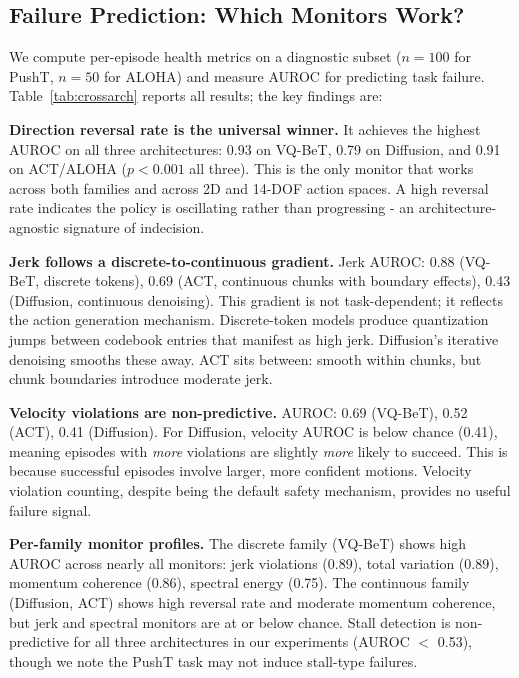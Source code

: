 \documentclass[conference]{IEEEtran}
\begin{document}
\subsection{Failure Prediction: Which Monitors Work?}
\label{sec:failure_prediction}

We compute per-episode health metrics on a diagnostic subset ($n{=}100$ for PushT, $n{=}50$ for ALOHA) and measure AUROC for predicting task failure.
Table~\ref{tab:crossarch} reports all results; the key findings are:

\textbf{Direction reversal rate is the universal winner.}
It achieves the highest AUROC on all three architectures: 0.93 on VQ-BeT, 0.79 on Diffusion, and 0.91 on ACT/ALOHA ($p < 0.001$ all three).
This is the only monitor that works across both families and across 2D and 14-DOF action spaces.
A high reversal rate indicates the policy is oscillating rather than progressing - an architecture-agnostic signature of indecision.

\textbf{Jerk follows a discrete-to-continuous gradient.}
Jerk AUROC: 0.88 (VQ-BeT, discrete tokens), 0.69 (ACT, continuous chunks with boundary effects), 0.43 (Diffusion, continuous denoising).
This gradient is not task-dependent; it reflects the action generation mechanism.
Discrete-token models produce quantization jumps between codebook entries that manifest as high jerk.
Diffusion's iterative denoising smooths these away.
ACT sits between: smooth within chunks, but chunk boundaries introduce moderate jerk.

\textbf{Velocity violations are non-predictive.}
AUROC: 0.69 (VQ-BeT), 0.52 (ACT), 0.41 (Diffusion).
For Diffusion, velocity AUROC is below chance (0.41), meaning episodes with \emph{more} violations are slightly \emph{more} likely to succeed.
This is because successful episodes involve larger, more confident motions.
Velocity violation counting, despite being the default safety mechanism, provides no useful failure signal.

\textbf{Per-family monitor profiles.}
The discrete family (VQ-BeT) shows high AUROC across nearly all monitors: jerk violations (0.89), total variation (0.89), momentum coherence (0.86), spectral energy (0.75).
The continuous family (Diffusion, ACT) shows high reversal rate and moderate momentum coherence, but jerk and spectral monitors are at or below chance.
Stall detection is non-predictive for all three architectures in our experiments (AUROC $<$ 0.53), though we note the PushT task may not induce stall-type failures.
\end{document}
